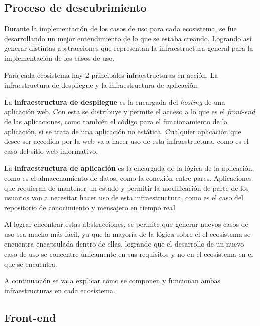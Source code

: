 \subsection{Proceso de descubrimiento}

Durante la implementación de los casos de uso para cada ecosistema, se fue desarrollando un mejor entendimiento de lo que se estaba creando. Logrando así generar distintas abstracciones que representan la infraestructura general para la implementación de los casos de uso.

Para cada ecosistema hay 2 principales infraestructuras en acción. La infraestructura de despliegue y la infraestructura de aplicación.

La \textbf{infraestructura de despliegue} es la encargada del \textit{hosting} de una aplicación web. Con esta se distribuye y permite el acceso a lo que es el \textit{front-end} de las aplicaciones, como también el código para el funcionamiento de la aplicación, si se trata de una aplicación no estática. Cualquier aplicación que desee ser accedida por la web va a hacer uso de esta infraestructura, como es el caso del sitio web informativo.

La \textbf{infraestructura de aplicación} es la encargada de la lógica de la aplicación, como es el almacenamiento de datos, como la conexión entre pares. Aplicaciones que requieran de mantener un estado y permitir la modificación de parte de los usuarios van a necesitar hacer uso de esta infraestructura, como es el caso del repositorio de conocimiento y mensajero en tiempo real.

Al lograr encontrar estas abstracciones, se permite que generar nuevos casos de uso sea mucho más fácil, ya que la mayoría de la lógica sobre el el ecosistema se encuentra encapsulada dentro de ellas, logrando que el desarrollo de un nuevo caso de uso se concentre únicamente en sus requisitos y no en el ecosistema en el que se encuentra.

A continuación se va a explicar como se componen y funcionan ambas infraestructuras en cada ecosistema.






\subsection{Front-end}

